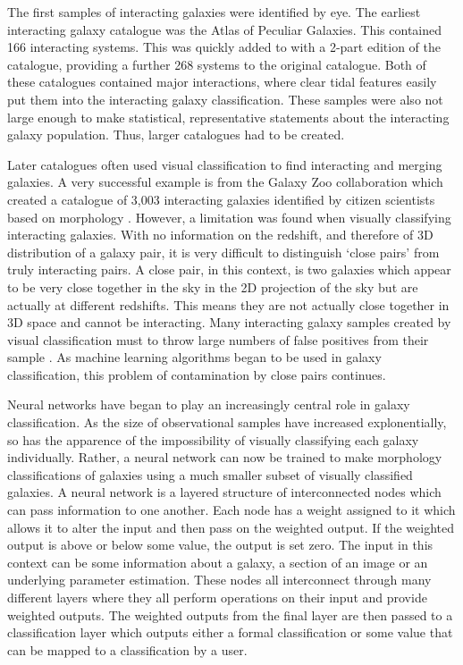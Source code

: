 The first samples of interacting galaxies were identified by eye. The earliest interacting galaxy catalogue was the \citet{1966ApJS...14....1A} Atlas of Peculiar Galaxies. This contained 166 interacting systems. This was quickly added to with a 2-part edition of the \citet{1977A&AS...28....1V} catalogue, providing a further 268 systems to the original \citet{1966ApJS...14....1A} catalogue. Both of these catalogues contained major interactions, where clear tidal features easily put them into the interacting galaxy classification. These samples were also not large enough to make statistical, representative statements about the interacting galaxy population. Thus, larger catalogues had to be created.

Later catalogues often used visual classification to find interacting and merging galaxies. A very successful example is from the Galaxy Zoo collaboration which created a catalogue of 3,003 interacting galaxies identified by citizen scientists based on morphology \citep{2010MNRAS.401.1043D}. However, a limitation was found when visually classifying interacting galaxies. With no information on the redshift, and therefore of 3D distribution of a galaxy pair, it is very difficult to distinguish `close pairs' from truly interacting pairs. A close pair, in this context, is two galaxies which appear to be very close together in the sky in the 2D projection of the sky but are actually at different redshifts. This means they are not actually close together in 3D space and cannot be interacting. Many interacting galaxy samples created by visual classification must to throw large numbers of false positives from their sample \citep{2020MNRAS.492.2075B, 2022A&A...661A..52P}. As machine learning algorithms began to be used in galaxy classification, this problem of contamination by close pairs continues.

Neural networks have began to play an increasingly central role in galaxy classification. As the size of observational samples have increased explonentially, so has the apparence of the impossibility of visually classifying each galaxy individually. Rather, a neural network can now be trained to make morphology classifications of galaxies using a much smaller subset of visually classified galaxies. A neural network is a layered structure of interconnected nodes which can pass information to one another. Each node has a weight assigned to it which allows it to alter the input and then pass on the weighted output. If the weighted output is above or below some value, the output is set zero. The input in this context can be some information about a galaxy, a section of an image or an underlying parameter estimation. These nodes all interconnect through many different layers where they all perform operations on their input and provide weighted outputs. The weighted outputs from the final layer are then passed to a classification layer which outputs either a formal classification or some value that can be mapped to a classification by a user.

